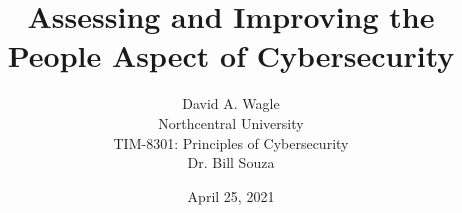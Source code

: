 \title{Assessing and Improving the People Aspect of Cybersecurity}
\author{David A. Wagle \\
Northcentral University \\ TIM-8301: Principles of Cybersecurity \\ Dr. Bill Souza}
\date{April 25, 2021}
